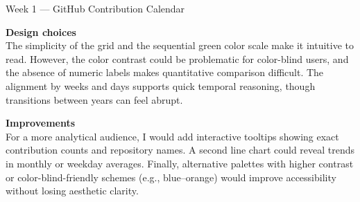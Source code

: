 \documentclass[aspectratio=169]{beamer}
\begin{document}
\begin{frame}{Week 1 — GitHub Contribution Calendar}
\begin{minipage}{0.5\textwidth}
  \vfill %
  
  \textbf{Design choices}\\
  The simplicity of the grid and the sequential green color scale make it intuitive to read. However, the color contrast could be problematic for color-blind users, and the absence of numeric labels makes quantitative comparison difficult. The alignment by weeks and days supports quick temporal reasoning, though transitions between years can feel abrupt.

  \vfill %
  
  \textbf{Improvements}\\
  For a more analytical audience, I would add interactive tooltips showing exact contribution counts and repository names. A second line chart could reveal trends in monthly or weekday averages. Finally, alternative palettes with higher contrast or color-blind-friendly schemes (e.g., blue–orange) would improve accessibility without losing aesthetic clarity.
  
  \vspace{0pt} %
\end{minipage}
\end{frame}



    
\end{document}
